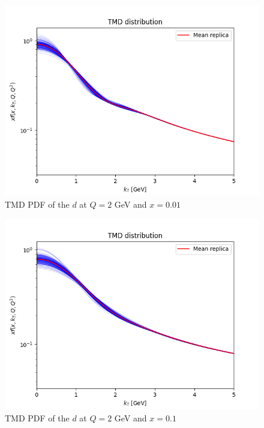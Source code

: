 \documentclass[
]{article}
\begin{document}
\begin{figure}
\centering
\includegraphics{pngplots/tmd_1_2_0.01.png}
\caption{TMD PDF of the \(d\) at \(Q = 2\) GeV and \(x = 0.01\)}
\end{figure}

\begin{figure}
\centering
\includegraphics{pngplots/tmd_1_2_0.1.png}
\caption{TMD PDF of the \(d\) at \(Q = 2\) GeV and \(x = 0.1\)}
\end{figure}
\end{document}
